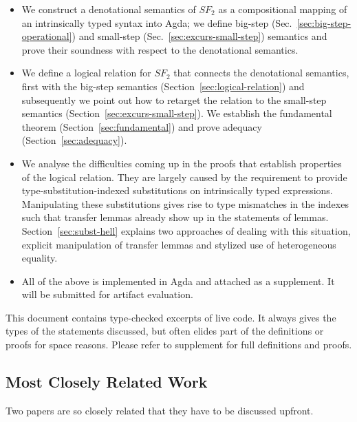 \documentclass[acmsmall,anonymous,review,screen]{acmart}
\begin{document}
\begin{itemize}
\item We construct a denotational semantics of $SF_2$ as a
  compositional mapping of an intrinsically typed syntax into Agda; we
  define big-step (Sec.~\ref{sec:big-step-operational}) and small-step
  (Sec.~\ref{sec:excurs-small-step}) semantics and prove their
  soundness with respect to the denotational semantics.
\item We define a logical relation for $SF_2$ that connects the
  denotational semantics, first with the big-step semantics
  (Section~\ref{sec:logical-relation}) and subsequently we point out
  how to retarget the relation to the small-step semantics
  (Section~\ref{sec:excurs-small-step}). We establish the fundamental
  theorem (Section~\ref{sec:fundamental}) and prove adequacy
  (Section~\ref{sec:adequacy}). 
\item We analyse the difficulties coming up in the proofs that
  establish properties of the logical relation. They are
  largely caused by the requirement to provide
  type-substitution-indexed substitutions on intrinsically typed
  expressions. Manipulating these substitutions gives rise to type
  mismatches in the indexes such that transfer lemmas already show up in the
  statements of lemmas. Section~\ref{sec:subst-hell} explains two
  approaches of dealing with this situation, explicit manipulation of
  transfer lemmas and stylized use of heterogeneous equality.
\item All of the above is implemented in Agda
  \cite{norell07:_towar_pract_progr_languag_depen_type_theor} and
  attached as a supplement. It will be submitted for artifact
  evaluation.
\end{itemize}
This document contains type-checked excerpts of live code. It always
gives the types of the statements discussed, but often elides part of
the definitions or proofs for space reasons. Please refer to
supplement for full definitions and proofs.

\subsection*{Most Closely Related Work}
\label{sec:most-closely-related}

Two papers are so closely related that they have to be discussed
upfront.
\end{document}
